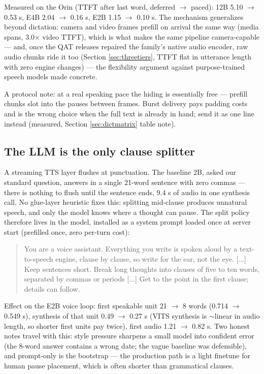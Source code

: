 \documentclass{article}
\begin{document}
Measured on the Orin (TTFT after last word, deferred $\rightarrow$ paced): 12B 5.10 $\rightarrow$ 0.53 s, E4B 2.04 $\rightarrow$ 0.16 s, E2B 1.15 $\rightarrow$ 0.10 s. The mechanism generalizes beyond dictation: camera and video frames prefill on arrival the same way (media spans, 3.0× video TTFT), which is what makes the same pipeline camera-capable --- and, once the QAT releases repaired the family's native audio encoder, raw audio chunks ride it too (Section \ref{sec:threetiers}, TTFT flat in utterance length with zero engine changes) --- the flexibility argument against purpose-trained speech models made concrete.

A protocol note: at a real speaking pace the hiding is essentially free --- prefill chunks slot into the pauses between frames. Burst delivery pays padding costs and is the wrong choice when the full text is already in hand; send it as one line instead (measured, Section \ref{sec:dictmatrix} table note).

\subsection{The LLM is the only clause splitter}
\label{sec:clause}

A streaming TTS layer flushes at punctuation. The baseline 2B, asked our standard question, answers in a single 21-word sentence with zero commas --- there is nothing to flush until the sentence ends, 9.4 s of audio in one synthesis call. No glue-layer heuristic fixes this: splitting mid-clause produces unnatural speech, and only the model knows where a thought can pause. The split policy therefore lives in the model, installed as a system prompt loaded once at server start (prefilled once, zero per-turn cost):

\begin{quote}
	You are a voice assistant. Everything you write is spoken aloud by a text-to-speech engine, clause by clause, so write for the ear, not the eye. [...] Keep sentences short. Break long thoughts into clauses of five to ten words, separated by commas or periods [...] Get to the point in the first clause; details can follow.
\end{quote}

Effect on the E2B voice loop: first speakable unit 21 $\rightarrow$ 8 words (0.714 $\rightarrow$ 0.549 s), synthesis of that unit 0.49 $\rightarrow$ 0.27 s (VITS synthesis is $\sim$linear in audio length, so shorter first units pay twice), first audio 1.21 $\rightarrow$ 0.82 s. Two honest notes travel with this: style pressure sharpens a small model into confident error (the 8-word answer contains a wrong date; the vague baseline was defensible), and prompt-only is the bootstrap --- the production path is a light finetune for human pause placement, which is often shorter than grammatical clauses.
\end{document}
